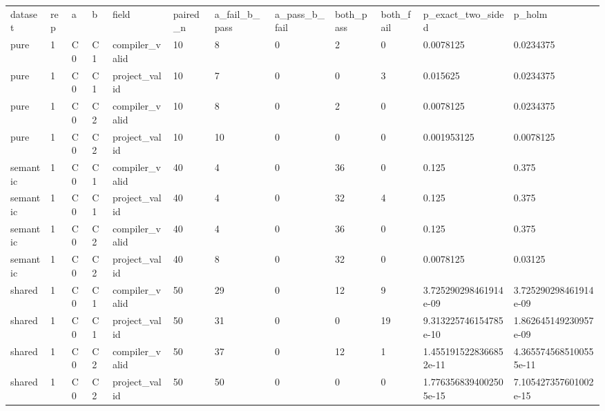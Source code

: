 \begin{tabular}{llllllllllll}
dataset & rep & a & b & field & paired\_n & a\_fail\_b\_pass & a\_pass\_b\_fail & both\_pass & both\_fail & p\_exact\_two\_sided & p\_holm \\
pure & 1 & C0 & C1 & compiler\_valid & 10 & 8 & 0 & 2 & 0 & 0.0078125 & 0.0234375 \\
pure & 1 & C0 & C1 & project\_valid & 10 & 7 & 0 & 0 & 3 & 0.015625 & 0.0234375 \\
pure & 1 & C0 & C2 & compiler\_valid & 10 & 8 & 0 & 2 & 0 & 0.0078125 & 0.0234375 \\
pure & 1 & C0 & C2 & project\_valid & 10 & 10 & 0 & 0 & 0 & 0.001953125 & 0.0078125 \\
semantic & 1 & C0 & C1 & compiler\_valid & 40 & 4 & 0 & 36 & 0 & 0.125 & 0.375 \\
semantic & 1 & C0 & C1 & project\_valid & 40 & 4 & 0 & 32 & 4 & 0.125 & 0.375 \\
semantic & 1 & C0 & C2 & compiler\_valid & 40 & 4 & 0 & 36 & 0 & 0.125 & 0.375 \\
semantic & 1 & C0 & C2 & project\_valid & 40 & 8 & 0 & 32 & 0 & 0.0078125 & 0.03125 \\
shared & 1 & C0 & C1 & compiler\_valid & 50 & 29 & 0 & 12 & 9 & 3.725290298461914e-09 & 3.725290298461914e-09 \\
shared & 1 & C0 & C1 & project\_valid & 50 & 31 & 0 & 0 & 19 & 9.313225746154785e-10 & 1.862645149230957e-09 \\
shared & 1 & C0 & C2 & compiler\_valid & 50 & 37 & 0 & 12 & 1 & 1.4551915228366852e-11 & 4.3655745685100555e-11 \\
shared & 1 & C0 & C2 & project\_valid & 50 & 50 & 0 & 0 & 0 & 1.7763568394002505e-15 & 7.105427357601002e-15 \\
\end{tabular}